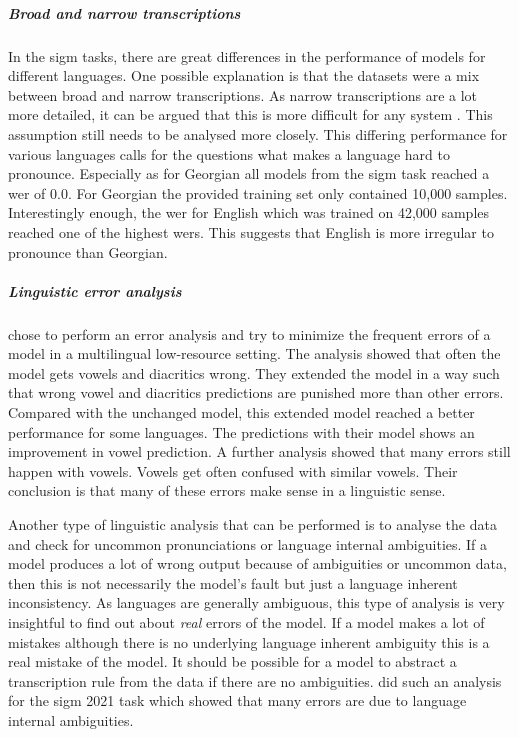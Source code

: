 \subparagraph{Broad and narrow transcriptions}
In the \ac{sigm} tasks, there are great differences in the performance of models for different languages. One possible explanation is that the datasets were a mix between broad and narrow transcriptions. As narrow transcriptions are a lot more detailed, it can be argued that this is more difficult for any system \citep{Ashby-Bartley.2021}. This assumption still needs to be analysed more closely. This differing performance for various languages calls for the questions what makes a language hard to pronounce. Especially as for Georgian all models from the \ac{sigm} task reached a \ac{wer} of $0.0$. For Georgian the provided training set only contained 10,000 samples. Interestingly enough, the \ac{wer} for English which was trained on 42,000 samples reached one of the highest \acp{wer}. This suggests that English is more irregular to pronounce than Georgian.

\subparagraph{Linguistic error analysis} \citet{lo-nicolai-2021-linguistic} chose to perform an error analysis and try to minimize the frequent errors of a model in a multilingual low-resource setting. The analysis showed that often the model gets vowels and diacritics wrong. They extended the model in a way such that wrong vowel and diacritics predictions are punished more than other errors. Compared with the unchanged model, this extended model reached a better performance for some languages. The predictions with their model shows an improvement in vowel prediction. A further analysis showed that many errors still happen with vowels. Vowels get often confused with similar vowels. Their conclusion is that many of these errors make sense in a linguistic sense. 

Another type of linguistic analysis that can be performed is to analyse the data and check for uncommon pronunciations or language internal ambiguities. If a model produces a lot of wrong output because of ambiguities or uncommon data, then this is not necessarily the model's fault but just a language inherent inconsistency. As languages are generally ambiguous, this type of analysis is very insightful to find out about \textit{real} errors of the model. If a model makes a lot of mistakes although there is no underlying language inherent ambiguity this is a real mistake of the model. It should be possible for a model to abstract a transcription rule from the data if there are no ambiguities. \cite{Ashby-Bartley.2021} did such an analysis for the \ac{sigm} 2021 task which showed that many errors are due to language internal ambiguities.


